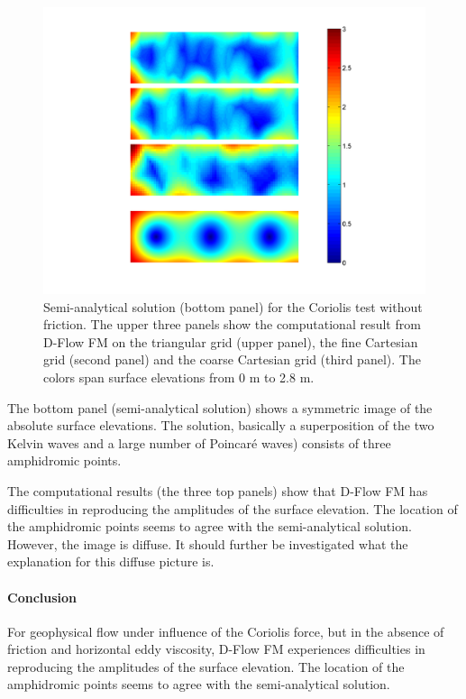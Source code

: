 \begin{figure}[h!]
\begin{center}
\includegraphics[width=1.0\columnwidth]{figures/basinnofriction.png}
\end{center}\caption{Semi-analytical solution (bottom panel) for the Coriolis test without friction. The upper three panels show the computational result from D-Flow FM on the triangular grid (upper panel), the fine Cartesian grid (second panel) and the coarse Cartesian grid (third panel). The colors span surface elevations from 0 m to 2.8 m. \label{fig:kelvinfricno}}
\end{figure}

The bottom panel (semi-analytical solution) shows a symmetric image of the absolute surface elevations. The solution, basically a superposition of the two Kelvin waves and a large number of Poincar\'e waves) consists of three amphidromic points. 

The computational results (the three top panels) show that D-Flow FM has difficulties in reproducing the amplitudes of the surface elevation. The location of the amphidromic points seems to agree with the semi-analytical solution. However, the image is diffuse. It should further be investigated what the explanation for this diffuse picture is. 




\paragraph*{Conclusion}
For geophysical flow under influence of the Coriolis force, but in the absence of friction and horizontal eddy viscosity, D-Flow FM experiences difficulties in reproducing the amplitudes of the surface elevation. The location of the amphidromic points seems to agree with the semi-analytical solution.



